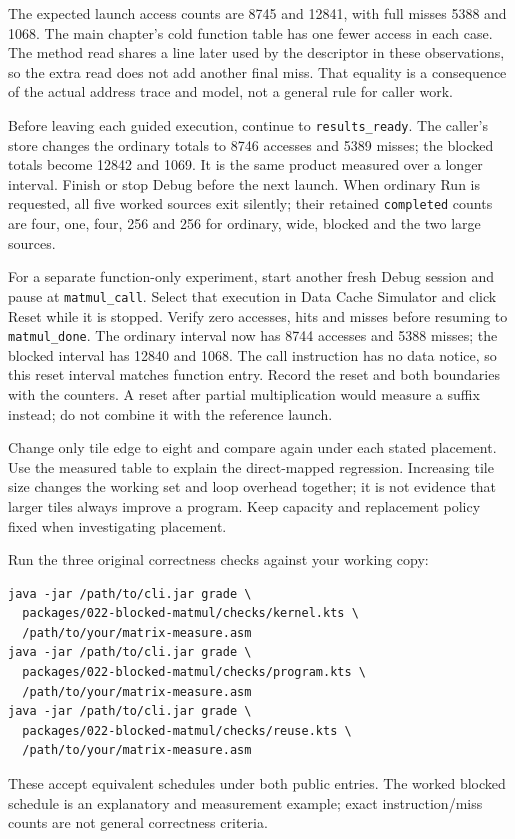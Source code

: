 The expected launch access counts are 8745 and 12841, with full misses 5388 and
1068. The main chapter's cold function table has one fewer access in each case.
The method read shares a line later used by the descriptor in these observations,
so the extra read does not add another final miss. That equality is a consequence
of the actual address trace and model, not a general rule for caller work.



Before leaving each guided execution, continue to \texttt{results\_ready}.
The caller's store changes the ordinary totals to 8746 accesses and 5389 misses;
the blocked totals become 12842 and 1069. It is the same product measured over
a longer interval. Finish or stop Debug before the next launch. When ordinary
Run is requested, all five worked sources exit silently; their retained
\texttt{completed} counts are four, one, four, 256 and 256 for ordinary, wide,
blocked and the two large sources.

For a separate function-only experiment, start another fresh Debug session and
pause at \texttt{matmul\_call}. Select that execution in Data Cache Simulator
and click Reset while it is stopped. Verify zero accesses, hits and misses before
resuming to \texttt{matmul\_done}. The ordinary interval now has 8744 accesses
and 5388 misses; the blocked interval has 12840 and 1068. The call instruction
has no data notice, so this reset interval matches function entry. Record the
reset and both boundaries with the counters. A reset after partial multiplication
would measure a suffix instead; do not combine it with the reference launch.

Change only tile edge to eight and compare again under each stated placement.
Use the measured table to explain the direct-mapped regression. Increasing tile
size changes the working set and loop overhead together; it is not evidence that
larger tiles always improve a program. Keep capacity and replacement policy fixed
when investigating placement.

\begin{samepage}
  Run the three original correctness checks against your working copy:
  \begin{verbatim}
java -jar /path/to/cli.jar grade \
  packages/022-blocked-matmul/checks/kernel.kts \
  /path/to/your/matrix-measure.asm
java -jar /path/to/cli.jar grade \
  packages/022-blocked-matmul/checks/program.kts \
  /path/to/your/matrix-measure.asm
java -jar /path/to/cli.jar grade \
  packages/022-blocked-matmul/checks/reuse.kts \
  /path/to/your/matrix-measure.asm
\end{verbatim}
  \par\end{samepage}
These accept equivalent schedules under both public entries. The worked blocked
schedule is an explanatory and measurement example; exact instruction/miss counts
are not general correctness criteria.


